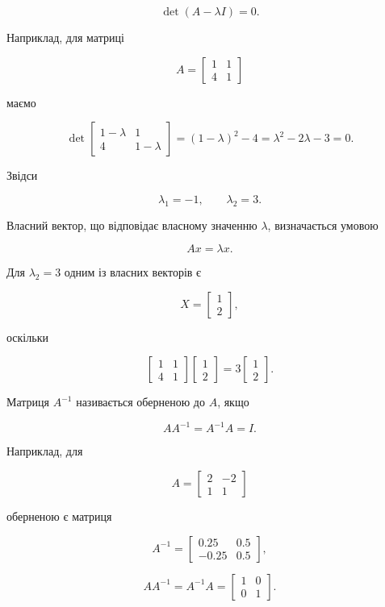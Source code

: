 \documentclass[
  ukrainian,
]{article}
\begin{document}
\[
\det(A-\lambda I)=0.
\]

Наприклад, для матриці

\[
A=\begin{bmatrix} 1 & 1 \\ 4 & 1 \end{bmatrix}
\]

маємо

\[
\det\!\begin{bmatrix} 1-\lambda & 1 \\ 4 & 1-\lambda \end{bmatrix}
= (1-\lambda)^2 - 4
= \lambda^2 - 2\lambda - 3 = 0.
\]

Звідси

\[
\lambda_1=-1,\qquad \lambda_2=3.
\]

Власний вектор, що відповідає власному значенню \(\lambda\),
визначається умовою

\[
Ax=\lambda x.
\]

Для \(\lambda_2=3\) одним із власних векторів є

\[
X=\begin{bmatrix} 1 \\ 2 \end{bmatrix},
\]

оскільки

\[
\begin{bmatrix} 1 & 1 \\ 4 & 1 \end{bmatrix}
\begin{bmatrix} 1 \\ 2 \end{bmatrix}
=
3\begin{bmatrix} 1 \\ 2 \end{bmatrix}.
\]

Матриця \(A^{-1}\) називається оберненою до \(A\), якщо

\[
AA^{-1}=A^{-1}A=I.
\]

Наприклад, для

\[
A=\begin{bmatrix} 2 & -2 \\ 1 & 1 \end{bmatrix}
\]

оберненою є матриця

\[
A^{-1}=
\begin{bmatrix}
0.25 & 0.5\\
-0.25 & 0.5
\end{bmatrix},
\]

\[AA^{-1}=A^{-1}A=\begin{bmatrix}1 & 0\\0 & 1\end{bmatrix}.\]
\end{document}
